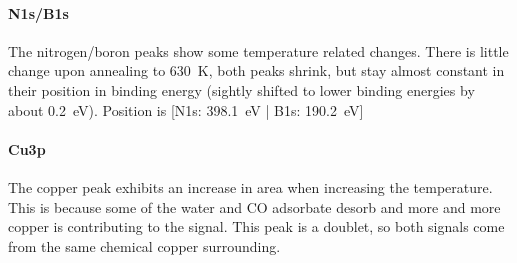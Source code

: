 \paragraph{N1s/B1s}
The nitrogen/boron peaks show some temperature related changes. There is little change upon annealing to \SI{630}{\K}, both peaks shrink, but stay almost constant in their position in binding energy (sightly shifted to lower binding energies by about \SI{0.2}{\eV}). Position is [N1s: \SI{398.1}{\eV} | B1s: \SI{190.2}{\eV}]

\paragraph{Cu3p}
The copper peak exhibits an increase in area when increasing the temperature. This is because some of the water and CO adsorbate desorb and more and more copper is contributing to the signal. This peak is a doublet, so both signals come from the same chemical copper surrounding.


